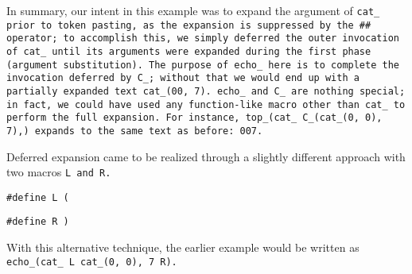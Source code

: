 In summary, our intent in this example was to expand the argument of \tt{cat_}
prior to token pasting, as the expansion is suppressed by the \tt{##} operator;
to accomplish this, we simply deferred the outer invocation of \tt{cat_} until
its arguments were expanded during the first phase (argument substitution).
The purpose of \tt{echo_} here is to complete the invocation deferred by \tt{C_};
without that we would end up with a partially expanded text \tt{cat_(00, 7)}.
\tt{echo_} and \tt{C_} are nothing special; in fact, we could have used
any function-like macro other than \tt{cat_} to perform the full expansion.
For instance, \tt{top_(cat_ C_(cat_(0, 0), 7),)}
expands to the same text as before: \tt{007}.

\note Deferred expansion came to be realized through a
slightly different approach with two macros \tt{L} and \tt{R}.

\centerline{\tt{#define L (}}
\centerline{\tt{#define R )}}

With this alternative technique, the earlier example
would be written as \tt{echo_(cat_ L cat_(0, 0), 7 R)}.

